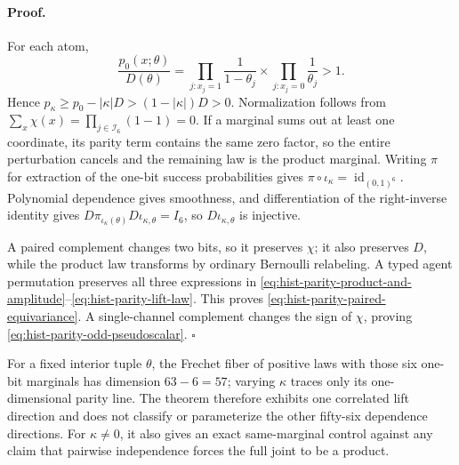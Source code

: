 \paragraph{Proof.}
For each atom,
\begin{equation}
\frac{p_0(x;\theta)}{D(\theta)}
=\prod_{j:x_j=1}\frac{1}{1-\theta_j}
\times
\prod_{j:x_j=0}\frac{1}{\theta_j}>1.
\label{eq:hist-parity-positivity-ratio}
\end{equation}
Hence
\(p_\kappa\geq p_0-|\kappa|D>(1-|\kappa|)D>0\).
Normalization follows from
\(\sum_x\chi(x)=\prod_{j\in\mathcal I_6}(1-1)=0\).  If a marginal sums out at
least one coordinate, its parity term contains the same zero factor, so the
entire perturbation cancels and the remaining law is the product marginal.
Writing \(\pi\) for extraction of the one-bit success probabilities gives
\(\pi\circ\iota_\kappa=\operatorname{id}_{(0,1)^6}\).  Polynomial
dependence gives smoothness, and differentiation of the right-inverse
identity gives
\(D\pi_{\iota_\kappa(\theta)}D\iota_{\kappa,\theta}=I_6\), so
\(D\iota_{\kappa,\theta}\) is injective.

A paired complement changes two bits, so it preserves \(\chi\); it also
preserves \(D\), while the product law transforms by ordinary Bernoulli
relabeling.  A typed agent permutation preserves all three expressions in
\eqref{eq:hist-parity-product-and-amplitude}--\eqref{eq:hist-parity-lift-law}.
This proves \eqref{eq:hist-parity-paired-equivariance}.  A single-channel
complement changes the sign of \(\chi\), proving
\eqref{eq:hist-parity-odd-pseudoscalar}.  \(\square\)

For a fixed interior tuple \(\theta\), the Frechet fiber of positive laws
with those six one-bit marginals has dimension \(63-6=57\); varying
\(\kappa\) traces only its one-dimensional parity line.  The theorem therefore
exhibits one correlated lift direction and does not classify or parameterize
the other fifty-six dependence directions.  For \(\kappa\ne0\), it also gives
an exact same-marginal control against any claim that pairwise independence
forces the full joint to be a product.  

